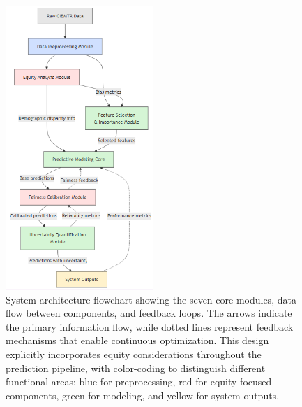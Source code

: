 \begin{figure}[H]
    \centering
    \includegraphics[width=0.5\textwidth]{figures/SystemArchitectureFlowchart.png}
    \caption{System architecture flowchart showing the seven core modules, data flow between components, and feedback loops. The arrows indicate the primary information flow, while dotted lines represent feedback mechanisms that enable continuous optimization. This design explicitly incorporates equity considerations throughout the prediction pipeline, with color-coding to distinguish different functional areas: blue for preprocessing, red for equity-focused components, green for modeling, and yellow for system outputs.}
    \label{fig:system_architecture_flowchart}
\end{figure}

